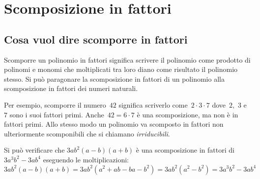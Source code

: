 
\section{Scomposizione in fattori}

\subsection{Cosa vuol dire scomporre in fattori}
\label{subsec:divpol_scomporre}

Scomporre un polinomio in fattori significa scrivere il polinomio come 
prodotto di polinomi e monomi che
moltiplicati tra loro diano come risultato il polinomio stesso. 
Si può paragonare la scomposizione in fattori
di un polinomio alla scomposizione in fattori dei numeri naturali.

\begin{minipage}{.4\textwidth}
\begin{inaccessibleblock}
 \begin{center}
 
 \end{center}
\end{inaccessibleblock}
\end{minipage}
\begin{minipage}{.6\textwidth}
\begin{inaccessibleblock}
 \begin{center}
 
 \end{center}
\end{inaccessibleblock}
\end{minipage}

Per esempio, scomporre il numero~$42$ significa scriverlo 
come~$2\cdot 3 \cdot 7$ dove~$2$,~$3$ e~$7$ sono i suoi fattori primi.
Anche~$42 = 6 \cdot 7$ è una scomposizione, ma non è in fattori primi. 
Allo stesso modo un polinomio va scomposto in fattori non ulteriormente
scomponibili che si chiamano \emph{irriducibili}. 

Si può verificare che \(3ab^{2}(a-b)(a+b)\) è una scomposizione in fattori di
\(3a^{3}b^{2}-3ab^{4}\) eseguendo le moltiplicazioni:
\[3ab^{2}(a-b)(a+b)=3ab^{2}(a^{2}+ab-ba-b^{2})=
  3ab^{2}\left(a^{2}-b^{2}\right)=3a^{3}b^{2}-3ab^{4}\]
  
